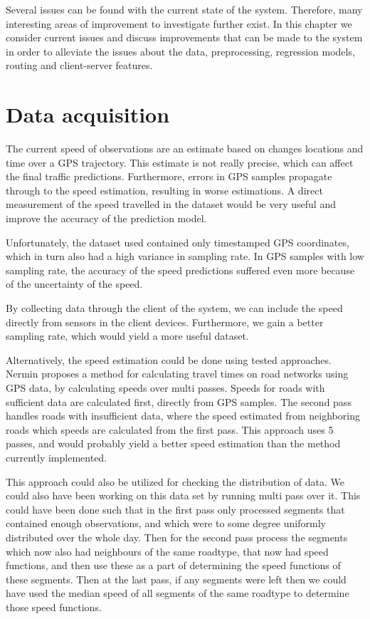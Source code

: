 Several issues can be found with the current state of the system. Therefore, many interesting areas of improvement to investigate further exist. In this chapter we consider current issues and discuss improvements that can be made to the system in order to alleviate the issues about the data, preprocessing, regression models, routing and client-server features.

\section{Data acquisition}
The current speed of observations are an estimate based on changes locations and time over a GPS trajectory. This estimate is not really precise, which can affect the final traffic predictions. Furthermore, errors in GPS samples propagate through to the speed estimation, resulting in worse estimations. A direct measurement of the speed travelled in the dataset would be very useful and improve the accuracy of the prediction model.

Unfortunately, the dataset used contained only timestamped GPS coordinates, which in turn also had a high variance in sampling rate. In GPS samples with low sampling rate, the accuracy of the speed predictions suffered even more because of the uncertainty of the speed.

By collecting data through the client of the system, we can include the speed directly from sensors in the client devices. Furthermore, we gain a better sampling rate, which would yield a more useful dataset.

Alternatively, the speed estimation could be done using tested approaches. Nermin\cite{Mudzelet07} proposes a method for calculating travel times on road networks using GPS data, by calculating speeds over multi passes. Speeds for roads with sufficient data are calculated first, directly from GPS samples. The second pass handles roads with insufficient data, where the speed estimated from neighboring roads which speeds are calculated from the first pass. This approach uses 5 passes, and would probably yield a better speed estimation than the method currently implemented.

This approach could also be utilized for checking the distribution of data. We could also have been working on this data set by running multi pass over it. This could have been done such that in the first pass only processed segments that contained enough observations, and which were to some degree uniformly distributed over the whole day. Then for the second pass process the segments which now also had neighbours of the same roadtype, that now had speed functions, and then use these as a part of determining the speed functions of these segments. Then at the last pass, if any segments were left then we could have used the median speed of all segments of the same roadtype to determine those speed functions.

